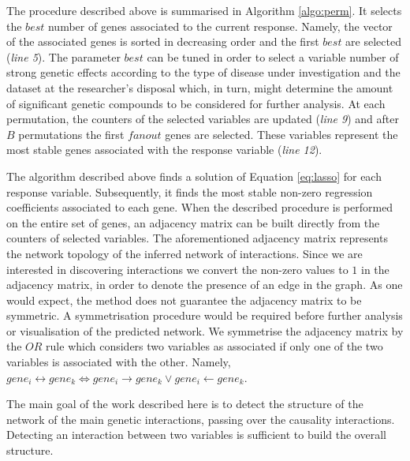 The procedure described above is summarised in Algorithm \ref{algo:perm}. 
It selects the $best$ number of genes associated to the current response. Namely, the vector of the associated genes is sorted in decreasing order and the first $best$ are selected (\emph{line 5}). The parameter $best$ can be tuned in order to select a variable number of strong genetic effects according to the type of disease under investigation and the dataset at the researcher's disposal which, in turn, might determine the amount of significant genetic compounds to be considered for further analysis.   
At each permutation, the counters of the selected variables are updated (\emph{line 9}) and after $B$ permutations the first $fanout$ genes are selected. These variables represent the most stable genes associated with the response variable (\emph{line 12}).

The algorithm described above finds a solution of Equation \ref{eq:lasso} for each response variable. Subsequently, it finds the most stable non-zero regression coefficients associated to each gene. 
When the described procedure is performed on the entire set of genes, an adjacency matrix can be built directly from the counters of selected variables. The aforementioned adjacency matrix represents the network topology of the inferred network of interactions. 
Since we are interested in discovering interactions we convert the non-zero values to $1$ in the adjacency matrix, in order to denote the presence of an edge in the graph.
As one would expect, the method does not guarantee the adjacency matrix to be symmetric. A symmetrisation procedure would be required before further analysis or visualisation of the predicted network. 
We symmetrise the adjacency matrix by the $OR$ rule which considers two variables as associated if only one of the two variables is associated with the other. Namely, $gene_i \leftrightarrow gene_k \iff gene_i \rightarrow gene_k \vee gene_i \leftarrow gene_k $.

The main goal of the work described here is to detect the structure of the network of the main genetic interactions, passing over the causality interactions. Detecting an interaction between two variables is sufficient to build the overall structure. 


